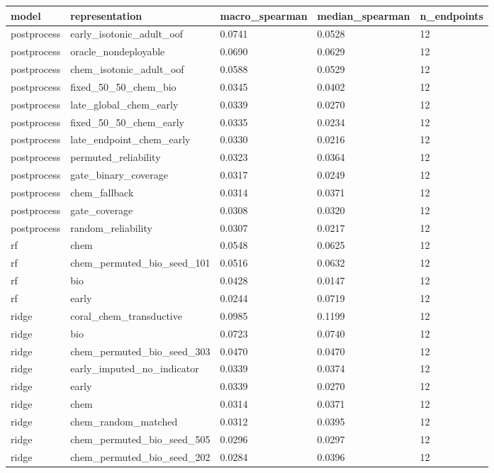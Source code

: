 \begin{tabular}{lllll}
\hline
model & representation & macro\_spearman & median\_spearman & n\_endpoints \\
\hline
postprocess & early\_isotonic\_adult\_oof & 0.0741 & 0.0528 & 12 \\
postprocess & oracle\_nondeployable & 0.0690 & 0.0629 & 12 \\
postprocess & chem\_isotonic\_adult\_oof & 0.0588 & 0.0529 & 12 \\
postprocess & fixed\_50\_50\_chem\_bio & 0.0345 & 0.0402 & 12 \\
postprocess & late\_global\_chem\_early & 0.0339 & 0.0270 & 12 \\
postprocess & fixed\_50\_50\_chem\_early & 0.0335 & 0.0234 & 12 \\
postprocess & late\_endpoint\_chem\_early & 0.0330 & 0.0216 & 12 \\
postprocess & permuted\_reliability & 0.0323 & 0.0364 & 12 \\
postprocess & gate\_binary\_coverage & 0.0317 & 0.0249 & 12 \\
postprocess & chem\_fallback & 0.0314 & 0.0371 & 12 \\
postprocess & gate\_coverage & 0.0308 & 0.0320 & 12 \\
postprocess & random\_reliability & 0.0307 & 0.0217 & 12 \\
rf & chem & 0.0548 & 0.0625 & 12 \\
rf & chem\_permuted\_bio\_seed\_101 & 0.0516 & 0.0632 & 12 \\
rf & bio & 0.0428 & 0.0147 & 12 \\
rf & early & 0.0244 & 0.0719 & 12 \\
ridge & coral\_chem\_transductive & 0.0985 & 0.1199 & 12 \\
ridge & bio & 0.0723 & 0.0740 & 12 \\
ridge & chem\_permuted\_bio\_seed\_303 & 0.0470 & 0.0470 & 12 \\
ridge & early\_imputed\_no\_indicator & 0.0339 & 0.0374 & 12 \\
ridge & early & 0.0339 & 0.0270 & 12 \\
ridge & chem & 0.0314 & 0.0371 & 12 \\
ridge & chem\_random\_matched & 0.0312 & 0.0395 & 12 \\
ridge & chem\_permuted\_bio\_seed\_505 & 0.0296 & 0.0297 & 12 \\
ridge & chem\_permuted\_bio\_seed\_202 & 0.0284 & 0.0396 & 12 \\

\end{tabular}
